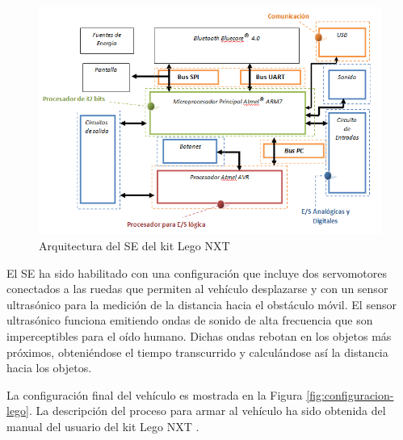 \documentclass[journal]{IEEEtran}
\begin{document}
\begin{figure}[!t]
\centering
\includegraphics[width=\columnwidth]{diagramas/arquitectura-lego}
\caption{Arquitectura del SE del kit Lego NXT}
\label{fig:arquitectura-se-lego}
\end{figure}

El SE ha sido habilitado con una configuración que incluye dos servomotores conectados a las ruedas que permiten al vehículo desplazarse y con un sensor ultrasónico para la medición de la distancia hacia el obstáculo móvil.
El sensor ultrasónico funciona emitiendo ondas de sonido de alta frecuencia que son imperceptibles para el oído humano. Dichas ondas rebotan en los objetos más próximos, obteniéndose el tiempo transcurrido y calculándose así la distancia hacia los objetos.

La configuración final del vehículo es mostrada en la Figura \ref{fig:configuracion-lego}.
La descripción del proceso para armar al vehículo ha sido obtenida del manual del usuario del kit Lego NXT \cite{LEGO2014}.
\end{document}
